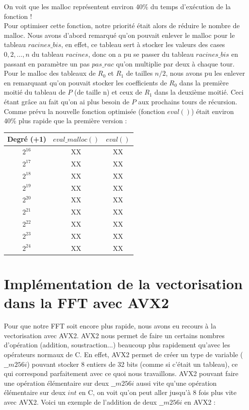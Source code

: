 \documentclass[12pt, a4paper]{article}
\begin{document}
On voit que les malloc représentent environ 40\% du temps d'exécution de la fonction ! \\
Pour optimiser cette fonction, notre priorité était alors de réduire le nombre de malloc. Nous avons d'abord remarqué qu'on pouvait enlever le malloc pour le tableau $racines\_bis$, en effet, ce tableau sert à stocker les valeurs des cases $0,2,\dots,n$ du tableau $racines$, donc on a pu se passer du tableau $racines\_bis$ en passant en paramètre un pas $pas\_rac$ qu'on multiplie par deux à chaque tour. \\
Pour le malloc des tableaux de $R_0$ et $R_1$ de tailles $n/2$, nous avons pu les enlever en remarquant qu'on pouvait stocker les coefficients de $R_0$ dans la première moitié du tableau de $P$ (de taille n) et ceux de $R_1$ dans la deuxième moitié. Ceci étant grâce au fait qu'on ai plus besoin de $P$ aux prochains tours de récursion.
Comme prévu la nouvelle fonction optimisée (fonction $eval()$) était environ 40\% plus rapide que la première version :

\begin{center}
\begin{tabular}{||c c c||}
\hline
Degré (+1) & $eval\_malloc()$ & $eval()$ \\
\hline\hline
$2^{16}$ & XX & XX \\
\hline
$2^{17}$ & XX & XX \\
\hline
$2^{18}$ & XX & XX \\
\hline
$2^{19}$ & XX & XX \\
\hline
$2^{20}$ & XX & XX \\
\hline
$2^{21}$ & XX & XX \\
\hline
$2^{22}$ & XX & XX \\
\hline
$2^{23}$ & XX & XX \\
\hline
$2^{24}$ & XX & XX \\
\hline
\end{tabular}
\end{center}

\section{Implémentation de la vectorisation dans la FFT avec AVX2}

Pour que notre FFT soit encore plus rapide, nous avons eu recours à la vectorisation avec AVX2. AVX2 nous permet de faire un certains nombres d'opération (addition, soustraction...) beaucoup plus rapidement qu'avec les opérateurs normaux de C. En effet, AVX2 permet de créer un type de variable ($\_\_m256i$) pouvant stocker 8 entiers de 32 bits (comme si c'était un tableau), ce qui correspond parfaitement avec ce quoi nous travaillons. AVX2 pouvant faire une opération élémentaire sur deux $\_\_m256i$ aussi vite qu'une opération élémentaire sur deux $int$ en C, on voit qu'on peut aller jusqu'à 8 fois plus vite avec AVX2. Voici un exemple de l'addition de deux $\_\_m256i$ en AVX2 : 
\end{document}

